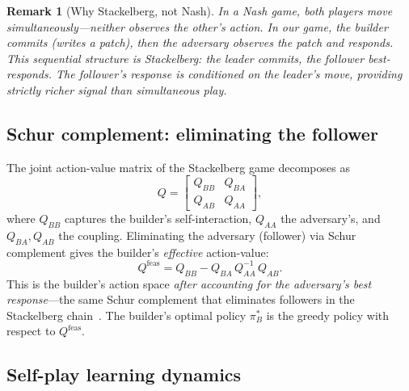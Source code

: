 \documentclass{article}
\newtheorem{remark}[theorem]{Remark}
\begin{document}
\begin{remark}[Why Stackelberg, not Nash]%
\label{rem:stackelberg-not-nash}
In a Nash game, both players move simultaneously---neither
observes the other's action.  In our game, the builder
\emph{commits} (writes a patch), then the adversary
\emph{observes} the patch and responds.  This sequential
structure is Stackelberg: the leader commits, the follower
best-responds.  The follower's response is
\emph{conditioned} on the leader's move, providing strictly
richer signal than simultaneous play.
\end{remark}

\subsection{Schur complement: eliminating the follower}

The joint action-value matrix of the Stackelberg game
decomposes as
\begin{equation}\label{eq:joint-Q}
  Q =
  \begin{bmatrix}
    Q_{BB} & Q_{BA} \\
    Q_{AB} & Q_{AA}
  \end{bmatrix},
\end{equation}
where $Q_{BB}$ captures the builder's self-interaction,
$Q_{AA}$ the adversary's, and $Q_{BA}, Q_{AB}$ the coupling.
Eliminating the adversary (follower) via Schur complement
gives the builder's \emph{effective} action-value:
\begin{equation}\label{eq:schur-game}
  Q^{\mathrm{feas}}
  = Q_{BB} - Q_{BA}\, Q_{AA}^{-1}\, Q_{AB}.
\end{equation}
This is the builder's action space \emph{after accounting for
the adversary's best response}---the same Schur complement
that eliminates followers in the Stackelberg
chain~\citep{kappen2005path}.  The builder's optimal policy
$\pi_B^*$ is the greedy policy with respect to
$Q^{\mathrm{feas}}$.

\subsection{Self-play learning dynamics}
\end{document}
